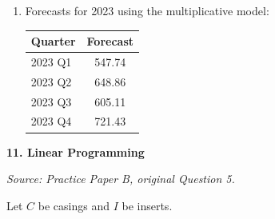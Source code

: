 \documentclass[11pt,a4paper]{article}
\begin{document}
\begin{enumerate}
Using MAD:
\[
\text{MAD}_{\text{add}} \approx 8.89,\qquad \text{MAD}_{\text{mult}} \approx 6.80
\]
where absolute error is calculated as $|\text{Actual} - \text{Forecast}|$.

For the multiplicative model:
\[
|522-515.68|=6.32,\quad |618-611.44|=6.56,\quad |572-570.71|=1.29,\quad |694-680.99|=13.01
\]
so
\[
\text{MAD}_{\text{mult}}=\frac{6.32+6.56+1.29+13.01}{4}\approx 6.80
\]

For the additive model:
\[
|522-521.76|=0.24,\quad |618-609.41|=8.59,\quad |572-574.80|=2.80,\quad |694-670.07|=23.93
\]
so
\[
\text{MAD}_{\text{add}}=\frac{0.24+8.59+2.80+23.93}{4}\approx 8.89
\]
The multiplicative model is better.

\item Forecasts for 2023 using the multiplicative model:

\begin{center}
\begin{tabular}{lc}
\toprule
Quarter & Forecast \\
\midrule
2023 Q1 & 547.74 \\
2023 Q2 & 648.86 \\
2023 Q3 & 605.11 \\
2023 Q4 & 721.43 \\
\bottomrule
\end{tabular}
\end{center}
\end{enumerate}

\newpage

\textbf{11. Linear Programming}

\textit{Source: Practice Paper B, original Question 5.}



Let $C$ be casings and $I$ be inserts.
\end{document}
